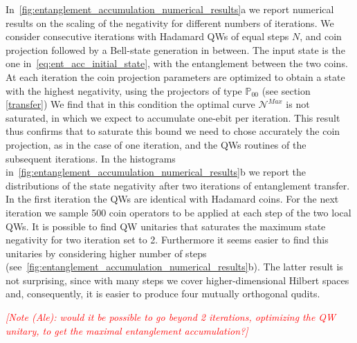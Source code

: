 \documentclass[
	aps, pra,
	superscriptaddress, twocolumn,
	floatfix,
	10pt
]{revtex4-1}
\newcommand{\parTitle}[1]{\noindent{\color{Mahogany}(\emph{#1})}}
\newcommand{\PP}{\mathbb{P}}
\newcommand{\commale}[1]{{\textcolor{red} {\it{[Note (Ale): #1]}}}}
\begin{document}
\parTitle{Numerical results \label{transfer}}
In~\cref{fig:entanglement_accumulation_numerical_results}a we report numerical results on the scaling of the negativity for different numbers of iterations.
We consider consecutive iterations with Hadamard QWs of equal steps $N$, and coin projection followed by a Bell-state generation in between. The input state is the one in~\cref{eq:ent_acc_initial_state}, with the entanglement between the two coins.
At each iteration the coin projection parameters are optimized to obtain a state with the highest negativity, using the projectors of type $\PP_{00}$ (see section \ref{transfer})
We find that in this condition the optimal curve $\mathcal{N}^{Max}$ is not saturated, in which we expect to accumulate one-ebit per iteration. This result thus confirms that to saturate this bound we need to chose accurately the coin projection, as in the case of one iteration, and the QWs routines of the subsequent iterations.
In the histograms in~\cref{fig:entanglement_accumulation_numerical_results}b we report the distributions of the state negativity after two iterations of entanglement transfer. In the first iteration the QWs are identical with Hadamard coins. For the next iteration we sample 500 coin operators to be applied at each step of the two local QWs.
It is possible to find QW unitaries that saturates the maximum state negativity for two iteration set to 2. Furthermore it seems easier to find this unitaries by considering higher number of steps (see~\cref{fig:entanglement_accumulation_numerical_results}b). The latter result is not surprising, since with many steps we cover higher-dimensional Hilbert spaces and, consequently, it is easier to produce four mutually orthogonal qudits.

\commale{would it be possible to go beyond 2 iterations, optimizing the QW unitary, to get the maximal entanglement accumulation?}

\parTitle{Conclusions?}
\end{document}
